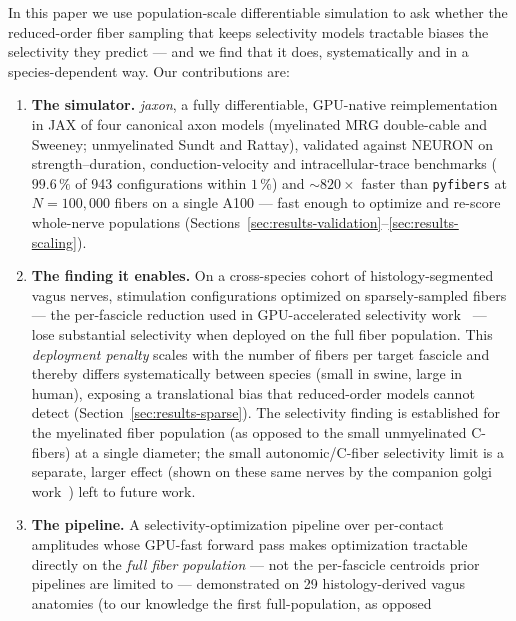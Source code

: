 In this paper we use population-scale differentiable simulation to ask
whether the reduced-order fiber sampling that keeps selectivity models
tractable biases the selectivity they predict --- and we find that it
does, systematically and in a species-dependent way.  Our
contributions are:

\begin{enumerate}
  \item \textbf{The simulator.}  \emph{jaxon}, a fully
        differentiable, GPU-native reimplementation in JAX of four
        canonical axon models (myelinated MRG double-cable and Sweeney;
        unmyelinated Sundt and Rattay), validated against NEURON on
        strength--duration, conduction-velocity and intracellular-trace
        benchmarks ($99.6\,\%$ of 943 configurations within $1\,\%$)
        and $\sim\!820\times$ faster than \texttt{pyfibers} at
        $N=100{,}000$ fibers on a single A100 --- fast enough to
        optimize and re-score whole-nerve populations
        (Sections~\ref{sec:results-validation}--\ref{sec:results-scaling}).
  \item \textbf{The finding it enables.}  On a cross-species cohort of
        histology-segmented vagus nerves, stimulation configurations
        optimized on sparsely-sampled fibers --- the per-fascicle
        reduction used in GPU-accelerated selectivity
        work~\cite{hussain2024axonml} --- lose substantial selectivity when
        deployed on the full fiber population.  This \emph{deployment
        penalty} scales with the number of fibers per target fascicle
        and thereby differs systematically between species (small in
        swine, large in human), exposing a translational bias that
        reduced-order models cannot detect
        (Section~\ref{sec:results-sparse}).  The selectivity finding is
        established for the myelinated fiber population (as opposed to the small unmyelinated C-fibers) at a single diameter;
        the small autonomic/C-fiber selectivity limit is a separate,
        larger effect (shown on these same nerves by the companion
        golgi work~\cite{lung2026golgi}) left to future work.
  \item \textbf{The pipeline.}  A selectivity-optimization pipeline
        over per-contact amplitudes whose GPU-fast forward pass makes
        optimization tractable directly on the \emph{full fiber
        population} --- not the per-fascicle centroids prior pipelines
        are limited to --- demonstrated on 29 histology-derived vagus
        anatomies (to our knowledge the first full-population, as opposed

\end{enumerate}
